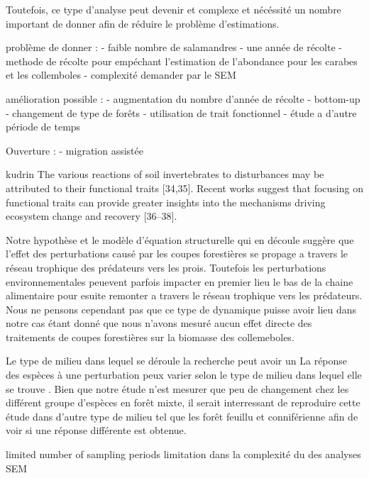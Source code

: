 Toutefois, ce type d'analyse peut devenir et complexe et nécéssité un nombre important de donner afin de réduire le problème d'estimations. 

problème  de donner : 
- faible nombre de salamandres
- une année de récolte
- methode de récolte pour empéchant l'estimation de l'abondance pour les carabes et les collemboles
- complexité demander par le SEM

amélioration possible : 
- augmentation du nombre d'année de récolte
- bottom-up
- changement de type de forêts
- utilisation de trait fonctionnel
- étude a d'autre période de temps

Ouverture :
- migration assistée


kudrin The various reactions of soil invertebrates to disturbances may be attributed to their functional traits [34,35]. 
Recent works suggest that focusing on functional traits can provide greater insights into the mechanisms driving ecosystem change and recovery [36–38].


Notre hypothèse et le modèle d'équation structurelle qui en découle suggère que l'effet des perturbations causé par les coupes forestières se propage a travers le réseau trophique des prédateurs vers les prois. 
Toutefois les perturbations environnementales peuevent parfois impacter en premier lieu le bas de la chaine alimentaire pour esuite remonter a travers le réseau trophique vers les prédateurs. 
Nous ne pensons cependant pas que ce type de dynamique puisse avoir lieu dans notre cas étant donné que nous n'avons mesuré aucun effet directe des traitements de coupes forestières sur la biomasse des collemeboles. 


Le type de milieu dans lequel se déroule la recherche peut avoir un 
La réponse des espèces à une perturbation peux varier selon le type de milieu dans lequel elle se trouve \citep{Kudrin2023metaanalysiseffects}. 
Bien que notre étude n'est mesurer que peu de changement chez les différent groupe d'espèces en forêt mixte, 
il serait interressant de reproduire cette étude dans d'autre type de milieu tel que les forêt feuillu et conniférienne afin de voir si une réponse différente est obtenue. 


  limited number of sampling periods
  limitation dans la complexité du des analyses SEM

